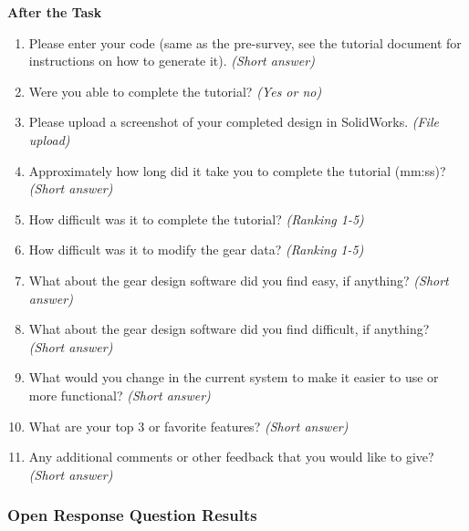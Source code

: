 \noindent\textbf{After the Task}
\begin{enumerate}
    \item Please enter your code (same as the pre-survey, see the tutorial document for instructions on how to generate it). \emph{(Short answer)}
    \item Were you able to complete the tutorial? \emph{(Yes or no)}
    \item Please upload a screenshot of your completed design in SolidWorks. \emph{(File upload)}
    \item Approximately how long did it take you to complete the tutorial (mm:ss)? \emph{(Short answer)}
    \item How difficult was it to complete the tutorial? \emph{(Ranking 1-5)}
    \item How difficult was it to modify the gear data? \emph{(Ranking 1-5)}
    \item What about the gear design software did you find easy, if anything? \emph{(Short answer)}
    \item What about the gear design software did you find difficult, if anything? \emph{(Short answer)}
    \item What would you change in the current system to make it easier to use or more functional? \emph{(Short answer)}
    \item What are your top 3 or favorite features? \emph{(Short answer)}
    \item Any additional comments or other feedback that you would like to give? \emph{(Short answer)}
\end{enumerate}

\subsubsection{Open Response Question Results}

